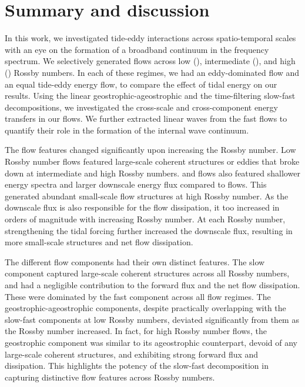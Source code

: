 \documentclass[../Rajarshi-thesis-draft.tex]{subfiles}
\begin{document}
	
\section{Summary and discussion} \label{edwv-sum}
	In this work, we investigated tide-eddy interactions across spatio-temporal scales with an eye on the formation of a broadband continuum in the frequency spectrum. We selectively generated flows across low (\lr), intermediate (\ir), and high (\hr) Rossby numbers. In each of these regimes, we had an eddy-dominated flow and an equal tide-eddy energy flow, to compare the effect of tidal energy on our results. Using the linear geostrophic-ageostrophic and the time-filtering slow-fast decompositions, we investigated the cross-scale and cross-component energy transfers in our flows. We further extracted linear waves from the fast flows to quantify their role in the formation of the internal wave continuum.
        
    
	The flow features changed significantly upon increasing the Rossby number. Low Rossby number \lr flows featured large-scale coherent structures or eddies that broke down at intermediate and high Rossby numbers. \ir and \hr flows also featured shallower energy spectra and larger downscale energy flux compared to \lr flows. This generated abundant small-scale flow structures at high Rossby number. As the downscale flux is also responsible for the flow dissipation, it too increased in orders of magnitude with increasing Rossby number.
	At each Rossby number, strengthening the tidal forcing further increased the downscale flux, resulting in more small-scale structures and net flow dissipation.
	   
	The different flow components had their own distinct features. The slow component captured large-scale coherent structures across all Rossby numbers, and had a negligible contribution to the forward flux and the net flow dissipation. These were dominated by the fast component across all flow regimes. The geostrophic-ageostrophic components, despite practically overlapping with the slow-fast components at low Rossby numbers, deviated significantly from them as the Rossby number increased. In fact, for high Rossby number \hr flows, the geostrophic component was similar to its ageostrophic counterpart, devoid of any large-scale coherent structures, and exhibiting strong forward flux and dissipation. This highlights the potency of the slow-fast decomposition in capturing distinctive flow features across Rossby numbers.  
	
\end{document}
